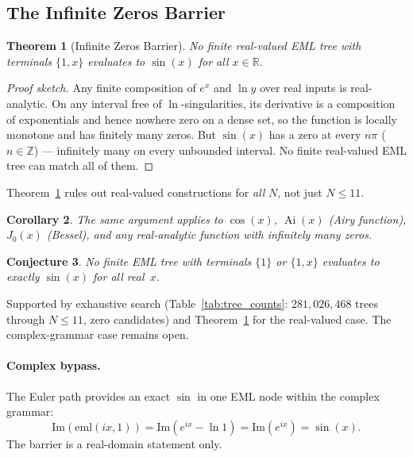 \documentclass[11pt,a4paper]{article}
\newtheorem{theorem}{Theorem}
\newtheorem{corollary}[theorem]{Corollary}
\newtheorem{conjecture}[theorem]{Conjecture}
\begin{document}
\subsection{The Infinite Zeros Barrier}

\begin{theorem}[Infinite Zeros Barrier]
\label{thm:barrier}
No finite real-valued EML tree with terminals $\{1,x\}$ evaluates to
$\sin(x)$ for all $x\in\mathbb{R}$.
\end{theorem}

\begin{proof}[Proof sketch]
Any finite composition of $e^x$ and $\ln y$ over real inputs is
real-analytic.
On any interval free of $\ln$-singularities, its derivative is a
composition of exponentials and hence nowhere zero on a dense set,
so the function is locally monotone and has finitely many zeros.
But $\sin(x)$ has a zero at every $n\pi$ ($n\in\mathbb{Z}$) ---
infinitely many on every unbounded interval.
No finite real-valued EML tree can match all of them.
\end{proof}

Theorem~\ref{thm:barrier} rules out real-valued constructions for
\emph{all} $N$, not just $N\leq11$.

\begin{corollary}
The same argument applies to $\cos(x)$, $\operatorname{Ai}(x)$
(Airy function), $J_0(x)$ (Bessel), and any real-analytic function
with infinitely many zeros.
\end{corollary}

\begin{conjecture}
No finite EML tree with terminals $\{1\}$ or $\{1,x\}$ evaluates to
exactly $\sin(x)$ for all real~$x$.
\end{conjecture}

Supported by exhaustive search (Table~\ref{tab:tree_counts}:
$281{,}026{,}468$ trees through $N\leq11$, zero candidates) and
Theorem~\ref{thm:barrier} for the real-valued case.
The complex-grammar case remains open.

\paragraph{Complex bypass.}
The Euler path provides an exact $\sin$ in one EML node within the
complex grammar:
\[
  \mathrm{Im}(\mathrm{eml}(ix,1))
  = \mathrm{Im}(e^{ix} - \ln 1)
  = \mathrm{Im}(e^{ix})
  = \sin(x).
\]
The barrier is a real-domain statement only.
\end{document}
